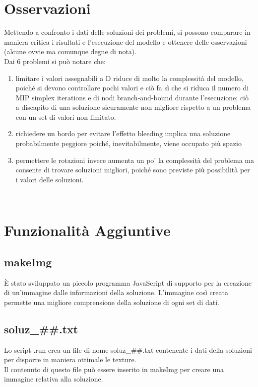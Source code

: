 
	\section{Osservazioni}
	
Mettendo a confronto i dati delle soluzioni dei problemi, si possono comparare in maniera critica i risultati e l'esecuzione del modello e ottenere delle osservazioni (alcune ovvie ma comunque degne di nota).\\
Dai 6 problemi si può notare che:
\begin{enumerate}
	\item limitare i valori assegnabili a D riduce di molto la complessità del modello, poiché si devono controllare pochi valori e ciò fa sì che si riduca il numero di MIP simplex iterations e di nodi branch-and-bound durante l'esecuzione; ciò a discapito di una soluzione sicuramente non migliore rispetto a un problema con un set di valori non limitato.
	\item richiedere un bordo per evitare l'effetto bleeding implica una soluzione probabilmente peggiore poiché, inevitabilmente, viene occupato più spazio
	\item permettere le rotazioni invece aumenta un po' la complessità del problema ma consente di trovare soluzioni migliori, poiché sono previste più possibilità per i valori delle soluzioni.
\end{enumerate}
\ \\





\section{Funzionalità Aggiuntive}

\subsection{makeImg}
È stato sviluppato un piccolo programma JavaScript di supporto per la creazione di un'immagine dalle informazioni della soluzione. L'immagine così creata permette una migliore comprensione della soluzione di ogni set di dati. 

\subsection{soluz\_\#\#.txt}
Lo script .run crea un file di nome soluz\_\#\#.txt contenente i dati della soluzioni per disporre in maniera ottimale le texture. \\
Il contenuto di questo file può essere inserito in makeImg per creare una immagine relativa alla soluzione.

\newpage
